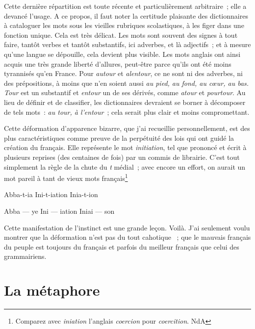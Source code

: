 \documentclass[french,twoside]{book} %
\def\mednobreak{\ifdim\lastskip<\medskipamount
  \removelastskip\nopagebreak\medskip\fi}
\newcommand{\labelblock}[1]{\medbreak{\noindent\color{rubric}\bfseries #1}\par\mednobreak}
\newcommand\chapteropen{} %
\newcommand\chapterclose{} %
\begin{document}
Cette dernière répartition est toute récente et particulièrement arbitraire ; elle a devancé l’usage. A ce propos, il faut noter la certitude plaisante des dictionnaires à cataloguer les mots sous les vieilles rubriques scolastiques, à les figer dans une fonction unique. Cela est très délicat. Les mots sont souvent des signes à tout faire, tantôt verbes et tantôt substantifs, ici adverbes, et là adjectifs ; et à mesure qu’une langue se dépouille, cela devient plus visible. Les mots anglais ont ainsi acquis une très grande liberté d’allures, peut-être parce qu’ils ont été moins tyrannisés qu’en France. Pour {\itshape autour} et {\itshape alentour}, ce ne sont ni des adverbes, ni des prépositions, à moins que n’en soient aussi {\itshape au pied, au fond, au cœur, au bas. Tour} est un substantif et {\itshape entour} un de ses dérivés, comme {\itshape atour} et {\itshape pourtour}. Au lieu de définir et de classifier, les dictionnaires devraient se borner à décomposer de tels mots : {\itshape au tour, à l’entour} ; cela serait plus clair et moins compromettant.\par

\labelblock{{\itshape Iniation.}}

\noindent Cette déformation d’apparence bizarre, que j’ai recueillie personnellement, est des plus caractéristiques comme preuve de la perpétuité des lois qui ont guidé la création du français. Elle représente le mot {\itshape initiation}, tel que prononcé et écrit à plusieurs reprises (des centaines de fois) par un commis de librairie. C’est tout simplement la règle de la chute du {\itshape t} médial ; avec encore un effort, on aurait un mot pareil à tant de vieux mots français\footnote{ Comparez avec {\itshape iniation} l’anglais {\itshape coercion} pour {\itshape coercition}. NdA}\par
Abba-t-ia Ini-t-iation Inia-t-ion\par
Abba — ye Ini — iation Iniai — son\par
Cette manifestation de l’instinct est une grande leçon. Voilà. J’ai seulement voulu montrer que la déformation n’est pas du tout cahotique  ; que le mauvais français du peuple est toujours du français et parfois du meilleur français que celui des grammairiens.
\chapterclose


\chapteropen
\chapter[{La métaphore}]{La métaphore }\renewcommand{\leftmark}{La métaphore }
\end{document}
